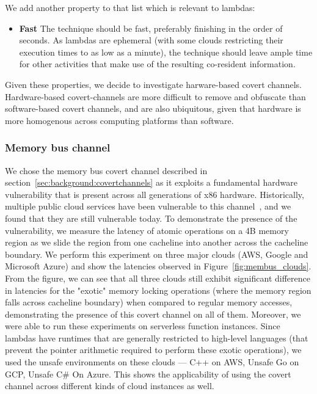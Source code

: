\noindent We add another property to that list which is relevant to lambdas:
\begin{itemize}
    \item \textbf{Fast} The technique should be fast, preferably finishing in 
    the order of seconds. As lambdas are ephemeral (with some clouds restricting their 
    execution times to as low as a minute), the technique should leave ample time 
    for other activities that make use of the resulting co-resident information.
\end{itemize}


Given these properties, we decide to investigate harware-based covert channels.
Hardware-based covert-channels are more difficult to remove and obfuscate than
software-based covert channels, and are also ubiquitous, given that
hardware is more homogenous across computing platforms than software. 


\subsubsection{Memory bus channel}
We chose the memory bus covert channel described in
section~\ref{sec:background:covertchannels} as it exploits a fundamental hardware
vulnerability that is present across all generations of x86 hardware.
Historically, multiple public cloud services have been vulnerable to this
channel~\cite{varad191016,zhang2016}, and we found that they are still
vulnerable today. To demonstrate the presence of the vulnerability, we measure
the latency of atomic operations on a 4B memory region as we slide the region
from one cacheline into another across the cacheline boundary. We perform this
experiment on three major clouds (AWS, Google and Microsoft Azure) and show the
latencies observed in Figure~\ref{fig:membus_clouds}. From the figure, we can
see that all three clouds still exhibit significant difference in latencies for
the "exotic" memory locking operations (where the memory region falls across
cacheline boundary) when compared to regular memory accesses, demonstrating the
presence of this covert channel on all of them. Moreover, we were able to run
these experiments on serverless function instances. Since lambdas have runtimes 
that are generally restricted to high-level languages
(that prevent the pointer arithmetic required to perform these exotic
operations), we used the unsafe environments on these clouds --- C++ on AWS,
Unsafe Go on GCP, Unsafe C\# On Azure. This shows the applicability of using the
covert channel across different kinds of cloud instances as well.


